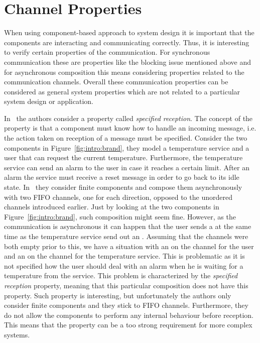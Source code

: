 \section{Channel Properties}
When using component-based approach to system design it is important that the components are interacting and communicating correctly. Thus, it is interesting to verify certain properties of the communication. For synchronous communication these are properties like the blocking issue mentioned above and for asynchronous composition this means considering properties related to the communication channels. Overall these communication properties can be considered as general system properties which are not related to a particular system design or application. 

In~\cite{Brand:1983:CFM:322374.322380} the authors consider a property called 
\emph{specified reception}. The concept of the property is that a component must know how to handle an incoming message, i.e. the action taken on reception of a message must be specified. Consider the two components in Figure~\ref{fig:intro:brand}, they model a temperature service and a user that can request the current temperature. Furthermore, the temperature service can send an alarm to the user in case it reaches a certain limit. After an alarm the service must receive a reset message in order to go back to its idle state. In~\cite{Brand:1983:CFM:322374.322380} they consider finite components and compose them asynchronously with two FIFO channels, one for each direction, opposed to the unordered channels introduced earlier. Just by looking at the two components in Figure~\ref{fig:intro:brand}, such composition might seem fine. However, as the communication is asynchronous it can happen that the user sends a  at the same time as the temperature service send out an . Assuming that the channels were both empty prior to this, we have a situation with an  on the channel for the user and an  on the channel for the temperature service. This is problematic as it is not specified how the user should deal with an alarm when he is waiting for a temperature from the service. This problem is characterized by the \emph{specified reception} property, meaning that this particular composition does not have this property. Such property is interesting, but unfortunately the authors only consider finite components and they stick to FIFO channels. Furthermore, they do not allow the components to perform any internal behaviour before reception. This means that the property can be a too strong requirement for more complex systems.

